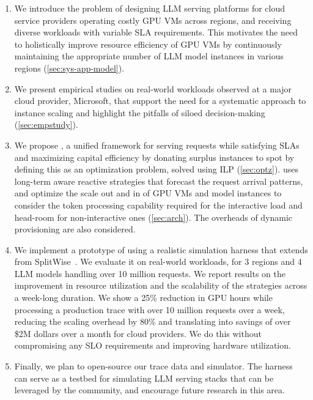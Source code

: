 \begin{enumerate}[leftmargin=*,noitemsep,topsep=0pt,parsep=0pt,partopsep=0pt]
 \item We introduce the problem of designing LLM serving platforms for cloud service providers operating costly GPU VMs across regions, and receiving diverse workloads with variable SLA requirements. This motivates the need to holistically improve resource efficiency of GPU VMs by continuously maintaining the appropriate number of LLM model instances in various regions (\autoref{sec:sys-app-model}). 
\item  We present empirical studies on real-world workloads observed at a major cloud provider, Microsoft, that support the need for a systematic approach to instance scaling and highlight the pitfalls of siloed decision-making (\autoref{sec:empstudy}).
\item  We propose \sys, a unified framework for serving requests while satisfying SLAs and maximizing capital efficiency by donating surplus instances to spot by defining this as an optimization problem, solved using ILP (\autoref{sec:optz}). \sys uses long-term aware reactive strategies that forecast the request arrival patterns, and optimize the scale out and in of GPU VMs and model instances to consider the token processing capability required for the interactive load and head-room for non-interactive ones (\autoref{sec:arch}). The overheads of dynamic provisioning are also considered.
\item We implement a prototype of \sys using a realistic simulation harness that extends from SplitWise~\cite{splitwise}. We evaluate it on real-world workloads, for 3 regions and 4 LLM models handling {over 10 million requests}. We report results on the improvement in resource utilization and the scalability of the strategies across a week-long duration. We show 
a 25\% reduction in GPU hours while processing a production trace with over 10 million requests over a week, reducing the scaling overhead by 80\% and translating into savings of over \$2M dollars over a month for cloud providers. We do this without compromising any SLO requirements and improving hardware utilization.
\item Finally, we plan to open-source our trace data and simulator. The harness can serve as a testbed for simulating LLM serving stacks that can be leveraged by the community, and encourage future research in this area.
\end{enumerate}
